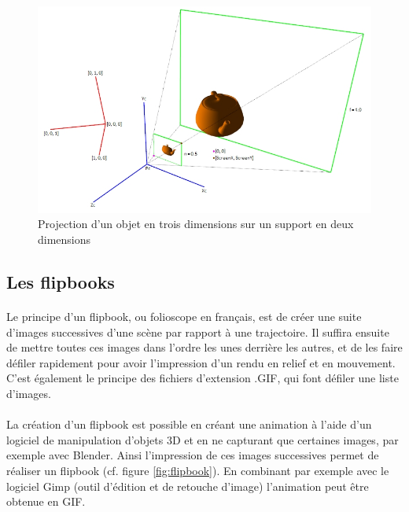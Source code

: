 \begin{figure}[h]
		\centering
		\includegraphics[scale=0.5]{projection.png}
		\caption{\label{fig:projection} Projection d’un objet en trois dimensions sur un support en deux dimensions \protect \footnotemark }
\end{figure}
	
	
\subsection{Les flipbooks}

\paragraph{}
	Le principe d’un flipbook, ou folioscope en français, est de créer une suite d’images successives d’une scène par rapport à une trajectoire. Il suffira ensuite de mettre toutes ces images dans l’ordre les unes derrière les autres, et de les faire défiler rapidement pour avoir l’impression d’un rendu en relief et en mouvement. C’est également le principe des fichiers d’extension .GIF, qui font défiler une liste d’images.

        
\paragraph{}
	La création d’un flipbook est possible en créant une animation à l’aide d’un logiciel de manipulation d’objets 3D et en ne capturant que certaines images, par exemple avec Blender. Ainsi l’impression de ces images successives permet de réaliser un flipbook (cf. figure \ref{fig:flipbook}). En combinant par exemple avec le logiciel Gimp (outil d’édition et de retouche d’image) l’animation peut être obtenue en GIF. 

